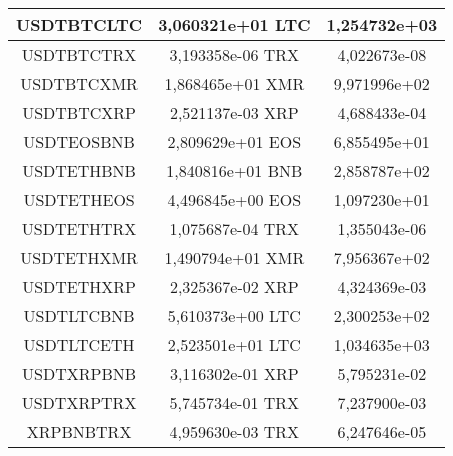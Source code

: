 \begin{table}
\begin{tabular}{|| c | c | c ||}
 \hline USDTBTCLTC & 3,060321e+01 LTC & 1,254732e+03\\ 
 \hline USDTBTCTRX & 3,193358e-06 TRX & 4,022673e-08\\ 
 \hline USDTBTCXMR & 1,868465e+01 XMR & 9,971996e+02\\ 
 \hline USDTBTCXRP & 2,521137e-03 XRP & 4,688433e-04\\ 
 \hline USDTEOSBNB & 2,809629e+01 EOS & 6,855495e+01\\ 
 \hline USDTETHBNB & 1,840816e+01 BNB & 2,858787e+02\\ 
 \hline USDTETHEOS & 4,496845e+00 EOS & 1,097230e+01\\ 
 \hline USDTETHTRX & 1,075687e-04 TRX & 1,355043e-06\\ 
 \hline USDTETHXMR & 1,490794e+01 XMR & 7,956367e+02\\ 
 \hline USDTETHXRP & 2,325367e-02 XRP & 4,324369e-03\\ 
 \hline USDTLTCBNB & 5,610373e+00 LTC & 2,300253e+02\\ 
 \hline USDTLTCETH & 2,523501e+01 LTC & 1,034635e+03\\ 
 \hline USDTXRPBNB & 3,116302e-01 XRP & 5,795231e-02\\ 
 \hline USDTXRPTRX & 5,745734e-01 TRX & 7,237900e-03\\ 
 \hline XRPBNBTRX & 4,959630e-03 TRX & 6,247646e-05\\ 
 \hline
\end{tabular}
\end{table}